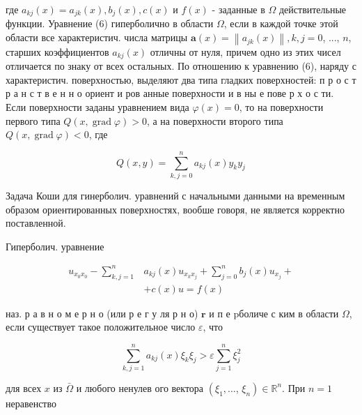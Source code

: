 \documentclass[10pt]{article}
\begin{document}
где $a_{k j}(x)=a_{j k}(x), b_{j}(x), c(x)$ и $f(x)$ - заданные в $\Omega$ действительные функции. Уравнение (6) гиперболично в области $\Omega$, если в каждой точке этой области все характеристич. числа матрицы $\boldsymbol{a}(x)=\left\|a_{j k}(x)\right\|, k, j=0$, ..., $n$, старших коэффициентов $a_{k j}(x)$ отличны от нуля, причем одно из этих чисел отличается по знаку от всех остальных. По отношению к уравнению (6), наряду с характеристич. поверхностью, выделяют два типа гладких поверхностей: п р о с т р а н с т в е н н о ориент и ров анные поверхности и в ны е пове р х о с ти. Если поверхности заданы уравнением вида $\varphi(x)=0$, то на поверхности первого типа $Q(x, \operatorname{grad} \varphi)>0$, а на поверхности второго типа $Q(x, \operatorname{grad} \varphi)<0$, где



\[

Q(x, y)=\sum_{k, j=0}^{n} a_{k j}(x) y_{k} y_{j}

\]



Задача Коши для гинерболич. уравнений с начальными данными на временным образом ориентированных поверхностях, вообше говоря, не является корректно поставленной.



Гиперболич. уравнение



\[

\begin{aligned}

u_{x_{0} x_{0}}-\sum_{k, j=1}^{n} & a_{k j}(x) u_{x_{k} x_{j}}+\sum_{j=0}^{n} b_{j}(x) u_{x_{j}}+ \\

& +c(x) u=f(x)

\end{aligned}

\]



наз. р а в н о м е р н о (или р е г у ля р н о) $\mathbf{r}$ и п е pболиче с ким в области $\Omega$, если существует такое положительное число $\varepsilon$, что



\[

\sum_{k, j=1}^{n} a_{k j}(x) \xi_{k} \xi_{j}>\varepsilon \sum_{j=1}^{n} \xi_{j}^{2}

\]



для всех $x$ из $\bar{\Omega}$ и любого ненулев ого вектора $\left(\xi_{1}, \ldots\right.$, $\left.\xi_{n}\right) \in \mathbb{R}^{n}$. При $n=1$ неравенство
\end{document}
